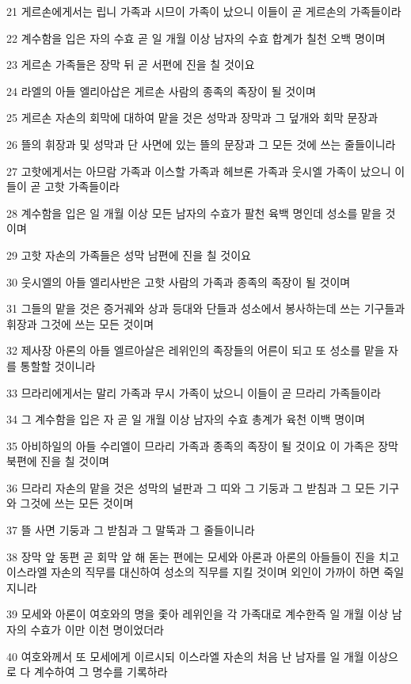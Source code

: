 \par 21 게르손에게서는 립니 가족과 시므이 가족이 났으니 이들이 곧 게르손의 가족들이라
\par 22 계수함을 입은 자의 수효 곧 일 개월 이상 남자의 수효 합계가 칠천 오백 명이며
\par 23 게르손 가족들은 장막 뒤 곧 서편에 진을 칠 것이요
\par 24 라엘의 아들 엘리아삽은 게르손 사람의 종족의 족장이 될 것이며
\par 25 게르손 자손의 회막에 대하여 맡을 것은 성막과 장막과 그 덮개와 회막 문장과
\par 26 뜰의 휘장과 및 성막과 단 사면에 있는 뜰의 문장과 그 모든 것에 쓰는 줄들이니라
\par 27 고핫에게서는 아므람 가족과 이스할 가족과 헤브론 가족과 웃시엘 가족이 났으니 이들이 곧 고핫 가족들이라
\par 28 계수함을 입은 일 개월 이상 모든 남자의 수효가 팔천 육백 명인데 성소를 맡을 것이며
\par 29 고핫 자손의 가족들은 성막 남편에 진을 칠 것이요
\par 30 웃시엘의 아들 엘리사반은 고핫 사람의 가족과 종족의 족장이 될 것이며
\par 31 그들의 맡을 것은 증거궤와 상과 등대와 단들과 성소에서 봉사하는데 쓰는 기구들과 휘장과 그것에 쓰는 모든 것이며
\par 32 제사장 아론의 아들 엘르아살은 레위인의 족장들의 어른이 되고 또 성소를 맡을 자를 통할할 것이니라
\par 33 므라리에게서는 말리 가족과 무시 가족이 났으니 이들이 곧 므라리 가족들이라
\par 34 그 계수함을 입은 자 곧 일 개월 이상 남자의 수효 총계가 육천 이백 명이며
\par 35 아비하일의 아들 수리엘이 므라리 가족과 종족의 족장이 될 것이요 이 가족은 장막 북편에 진을 칠 것이며
\par 36 므라리 자손의 맡을 것은 성막의 널판과 그 띠와 그 기둥과 그 받침과 그 모든 기구와 그것에 쓰는 모든 것이며
\par 37 뜰 사면 기둥과 그 받침과 그 말뚝과 그 줄들이니라
\par 38 장막 앞 동편 곧 회막 앞 해 돋는 편에는 모세와 아론과 아론의 아들들이 진을 치고 이스라엘 자손의 직무를 대신하여 성소의 직무를 지킬 것이며 외인이 가까이 하면 죽일지니라
\par 39 모세와 아론이 여호와의 명을 좇아 레위인을 각 가족대로 계수한즉 일 개월 이상 남자의 수효가 이만 이천 명이었더라
\par 40 여호와께서 또 모세에게 이르시되 이스라엘 자손의 처음 난 남자를 일 개월 이상으로 다 계수하여 그 명수를 기록하라
